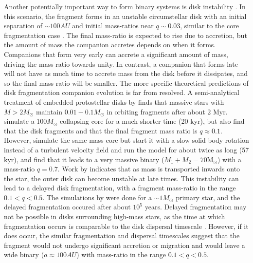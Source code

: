 Another potentially important way to form binary systems is disk instability
\citep[see e.g.][]{Kratter2006, Stamatellos2011}. In
this scenario, the fragment forms in an unstable circumstellar disk
with an initial separation of $\sim 100 AU$ and initial mass-ratios
near $q \sim 0.03$, similar to the core fragmentation case
\citep{Kratter2006}. The final mass-ratio is expected to rise due to accretion, but the
amount of mass the companion accretes depends on when it forms. Companions that form very
early can accrete a significant amount of mass, driving the mass ratio towards unity. In contrast,
a companion that forms late will not have as much time to accrete mass from the disk before it
dissipates, and so the final mass ratio will be smaller. The more specific theoretical predictions of disk fragmentation companion evolution is far from resolved. A semi-analytical treatment of embedded protostellar disks by \cite{Kratter2008} finds that massive stars with $M > 2M_{\odot}$ maintain $0.01 - 0.1 M_{\odot}$ in orbiting fragments after about 2 Myr. \cite{Krumholz2007}
simulate a $100 M_{\odot}$ collapsing core for a much shorter time (20 kyr),
but also find that the disk fragments and that the final fragment mass
ratio is $q \approx 0.1$. However, \cite{Krumholz2009} simulate the same mass core
but start it with a slow solid body rotation instead of a turbulent velocity field and run the model for about twice as long (57 kyr), and find that it leads to a very massive binary ($M_1 + M_2 = 70 \mathrm{M}_{\odot}$) with 
a mass-ratio $q = 0.7$. Work by \cite{Clarke2009} indicates that as
mass is transported inwards onto the star, the outer disk can become unstable at late times. This
instability can lead to a delayed disk fragmentation,
with a fragment mass-ratio in the range $0.1 < q <
0.5$. The simulations by \cite{Clarke2009} were done for a $\sim
1M_{\odot}$ primary star, and the delayed fragmentation occured after
about $10^5$ years. Delayed fragmentation may not be possible in disks surrounding
high-mass stars, as the time at which fragmentation occurs is
comparable to the disk dispersal timescale \citep{Klahr2006}. However,
if it does occur, the similar fragmentation and dispersal timescales suggest that the fragment
would not undergo significant accretion or migration and would leave a
wide binary ($a \approx 100 AU$) with mass-ratio in the range $0.1 < q <
0.5$.

